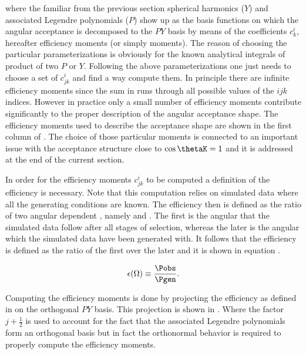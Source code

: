 \noindent where the familiar from the previous section spherical harmonics ($Y$) and associated Legendre polynomials ($P$) show up as the basis
functions on which the angular acceptance is decomposed to the $PY$ basis by means of the coefficients $c^i_{k}$, hereafter efficiency moments (or simply moments).
The reason of choosing the particular parameterizations is obviously for the known analytical integrals of product of two $P$ or $Y$.
Following the above parameterizations one just needs to choose a set of $c^i_{jk}$ and find a way compute them. In principle there are infinite efficiency moments
since the sum in  runs through all possible values of the $ijk$ indices. However in practice only a small number of efficiency moments
contribute significantly to the proper description of the angular acceptance shape. The efficiency moments used to describe the acceptance
shape are shown in the first column of . The choice of those particular moments is connected to an important issue with the acceptance
structure close to $\cos\thetaK=1$ and it is addressed at the end of the current section.

In order for the efficiency moments $c^i_{jk}$ to be computed a definition of the efficiency is necessary. Note that this computation relies on
simulated data where all the generating conditions are known. The efficiency then is defined as the ratio of two angular dependent \pdfs, namely
\Pobs and \Pgen. The first is the angular \pdf that the simulated data follow after all stages of selection, whereas
the later is the angular \pdf which the simulated data have been generated with. It follows that the efficiency is defined as the ratio of the first
over the later and it is shown in equation .

\begin{center}
\begin{equation}
  \epsilon(\Omega) \equiv \frac{\Pobs}{\Pgen}.
  \label{eff_def}
\end{equation}
\end{center}

\noindent Computing the efficiency moments is done by projecting the efficiency as defined in  on the orthogonal $PY$ basis.
This projection is shown in . Where the factor $j+\frac{1}{2}$ is used to account for the fact that the associated Legendre
polynomials form an orthogonal basis but in fact the orthonormal behavior is required to properly compute the efficiency moments.


